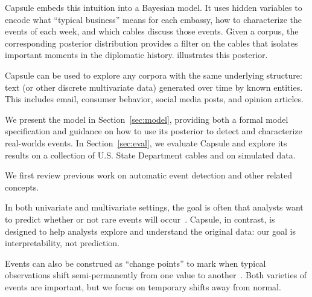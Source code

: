 Capsule embeds this intuition into a Bayesian model. It uses hidden
variables to encode what ``typical business'' means for each embassy,
how to characterize the events of each week, and which cables discuss
those events. Given a corpus, the corresponding posterior distribution
provides a filter on the cables that isolates important moments in the
diplomatic history.  illustrates this
posterior.

Capsule can be used to explore any corpora with the same underlying
structure: text (or other discrete multivariate data) generated over time by known entities.  This includes
email, consumer behavior, social media posts, and opinion articles.

We present the model in Section~\ref{sec:model}, providing both a formal
model specification and guidance on how to use its posterior to detect 
and characterize real-worlds events.
In Section~\ref{sec:eval}, we evaluate Capsule and explore its results on
a collection of U.S. State Department cables and on simulated data.

 We first review previous work on automatic
event detection and other related concepts.

In both univariate and multivariate settings, the goal is often that analysts want to predict whether or not rare events will occur~\cite{weiss1998learning,das2008anomaly}.  Capsule, in contrast, is designed to help analysts explore and understand the original data: our goal is interpretability, not prediction.

Events can also be construed as ``change points'' to mark when typical observations shift semi-permanently from one value to another~\cite{guralnik1999event,adams2007bayesian}. Both varieties of events are important, but we focus on temporary shifts away from normal.

